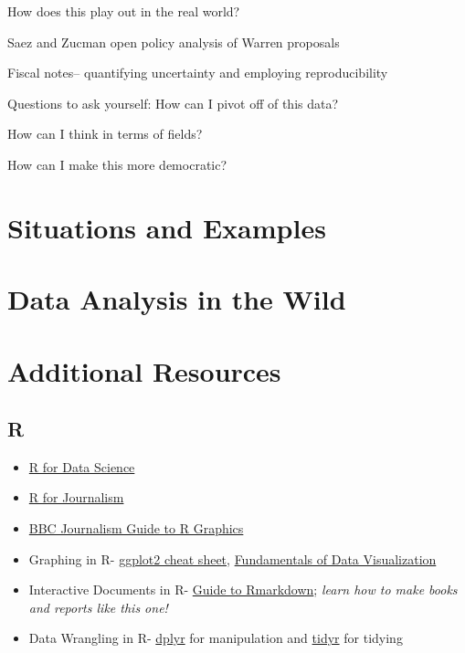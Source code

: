 \documentclass[]{book}
\providecommand{\tightlist}{%
  \setlength{\itemsep}{0pt}\setlength{\parskip}{0pt}}
\begin{document}
How does this play out in the real world?

Saez and Zucman open policy analysis of Warren proposals

Fiscal notes-- quantifying uncertainty and employing reproducibility

Questions to ask yourself:
How can I pivot off of this data?

How can I think in terms of fields?

How can I make this more democratic?

\hypertarget{situations-and-examples}{%
\section{Situations and Examples}\label{situations-and-examples}}

\hypertarget{data-analysis-in-the-wild}{%
\section{Data Analysis in the Wild}\label{data-analysis-in-the-wild}}

\hypertarget{additional-resources}{%
\section{Additional Resources}\label{additional-resources}}

\hypertarget{r}{%
\subsection{R}\label{r}}

\begin{itemize}
\tightlist
\item
  \href{https://r4ds.had.co.nz/}{R for Data Science}
\item
  \href{https://learn.r-journalism.com/en/}{R for Journalism}
\item
  \href{https://bbc.github.io/rcookbook/}{BBC Journalism Guide to R Graphics}
\item
  Graphing in R- \href{https://rstudio.com/wp-content/uploads/2015/03/ggplot2-cheatsheet.pdf}{ggplot2 cheat sheet}, \href{https://serialmentor.com/dataviz/}{Fundamentals of Data Visualization}
\item
  Interactive Documents in R- \href{https://bookdown.org/yihui/rmarkdown/}{Guide to Rmarkdown}; \emph{learn how to make books and reports like this one!}
\item
  Data Wrangling in R- \href{https://dplyr.tidyverse.org/}{dplyr} for manipulation and \href{https://github.com/tyleransom/EconometricsLabs/blob/master/tidyRcheatsheet.pdf}{tidyr} for tidying
\end{itemize}
\end{document}
